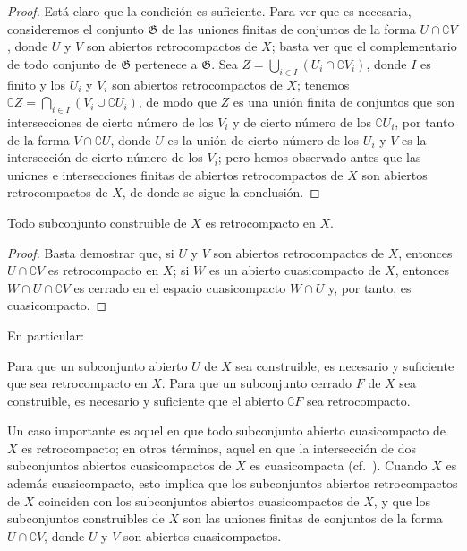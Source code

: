 \documentclass[oneside]{amsart}
\newcommand{\oldpage}[2][]{{\marginnote{\normalfont\textbf{#1}~|~#2}}\ignorespaces}
\let\EGAOriginalLabel\label
\renewcommand{\label}[1]{\phantomsection\EGAOriginalLabel{#1}}
\begin{document}
\begin{proof}
Está claro que la condición es suficiente.
Para ver que es necesaria, consideremos el conjunto $\mathfrak{G}$ de las uniones finitas de conjuntos de la forma $U\cap\complement{V}$, donde $U$ y $V$ son abiertos retrocompactos de $X$; basta ver que el complementario de todo conjunto de $\mathfrak{G}$ pertenece a $\mathfrak{G}$.
Sea $Z=\bigcup_{i\in I}(U_i\cap\complement{V_i})$, donde $I$ es finito y los $U_i$ y $V_i$ son abiertos retrocompactos de $X$; tenemos
$\complement{Z}=\bigcap_{i\in I}(V_i\cup\complement{U_i})$, de modo que $Z$ es una unión finita de conjuntos que son intersecciones de cierto número de los $V_i$ y de cierto número de los $\complement{U_i}$, por tanto de la forma
\oldpage[0\textsubscript{III}]{13}
$V\cap\complement{U}$, donde $U$ es la unión de cierto número de los $U_i$ y $V$ es la intersección de cierto número de los $V_i$; pero hemos observado antes que las uniones e intersecciones finitas de abiertos retrocompactos de $X$ son abiertos retrocompactos de $X$, de donde se sigue la conclusión.
\end{proof}

\begin{corollary}[9.1.4]
\label{0.9.1.4}
Todo subconjunto construible de $X$ es retrocompacto en $X$.
\end{corollary}

\begin{proof}
Basta demostrar que, si $U$ y $V$ son abiertos retrocompactos de $X$, entonces $U\cap\complement{V}$ es retrocompacto en $X$; si $W$ es un abierto cuasicompacto de $X$, entonces $W\cap U\cap\complement{V}$ es cerrado en el espacio cuasicompacto $W\cap U$ y, por tanto, es cuasicompacto.
\end{proof}

En particular:
\begin{corollary}[9.1.5]
\label{0.9.1.5}
Para que un subconjunto abierto $U$ de $X$ sea construible, es necesario y suficiente que sea retrocompacto en $X$.
Para que un subconjunto cerrado $F$ de $X$ sea construible, es necesario y suficiente que el abierto $\complement{F}$ sea retrocompacto.
\end{corollary}

\begin{env}[9.1.6]
\label{0.9.1.6}
Un caso importante es aquel en que todo subconjunto abierto cuasicompacto de $X$ es retrocompacto; en otros términos, aquel en que la intersección de dos subconjuntos abiertos cuasicompactos de $X$ es cuasicompacta (cf.~).
Cuando $X$ es además cuasicompacto, esto implica que los subconjuntos abiertos retrocompactos de $X$ coinciden con los subconjuntos abiertos cuasicompactos de $X$, y que los subconjuntos construibles de $X$ son las uniones finitas de conjuntos de la forma $U\cap\complement{V}$, donde $U$ y $V$ son abiertos cuasicompactos.
\end{env}
\end{document}
